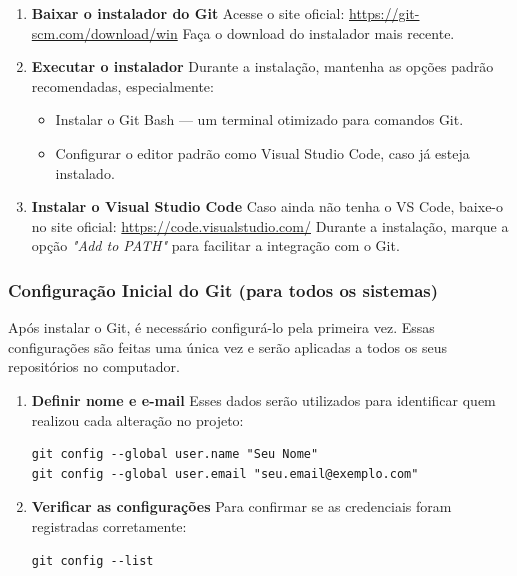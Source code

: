 \begin{enumerate}
    \item \textbf{Baixar o instalador do Git}  
    Acesse o site oficial:  
    \url{https://git-scm.com/download/win}  
    Faça o download do instalador mais recente.

    \item \textbf{Executar o instalador}  
    Durante a instalação, mantenha as opções padrão recomendadas, especialmente:
    \begin{itemize}
        \item Instalar o Git Bash — um terminal otimizado para comandos Git.
        \item Configurar o editor padrão como Visual Studio Code, caso já esteja instalado.
    \end{itemize}

    \item \textbf{Instalar o Visual Studio Code}  
    Caso ainda não tenha o VS Code, baixe-o no site oficial:  
    \url{https://code.visualstudio.com/}  
    Durante a instalação, marque a opção \textit{"Add to PATH"} para facilitar a integração com o Git.
\end{enumerate}

\subsubsection*{Configuração Inicial do Git (para todos os sistemas)}

Após instalar o Git, é necessário configurá-lo pela primeira vez. Essas configurações são feitas uma única vez e serão aplicadas a todos os seus repositórios no computador.

\begin{enumerate}
    \item \textbf{Definir nome e e-mail}  
    Esses dados serão utilizados para identificar quem realizou cada alteração no projeto:
    \begin{lstlisting}[style=shellstyle]
git config --global user.name "Seu Nome"
git config --global user.email "seu.email@exemplo.com"
    \end{lstlisting}

    \item \textbf{Verificar as configurações}  
    Para confirmar se as credenciais foram registradas corretamente:
    \begin{lstlisting}[style=shellstyle]
git config --list
    \end{lstlisting}
\end{enumerate}

